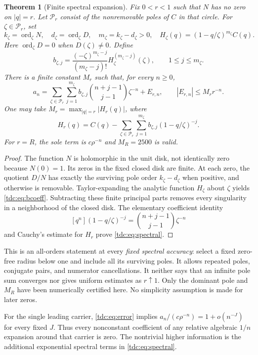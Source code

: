 \documentclass[11pt]{article}
\newtheorem{theorem}{Theorem}[section]
\theoremstyle{definition}\newtheorem{definition}[theorem]{Definition}
\theoremstyle{remark}\newtheorem{remark}[theorem]{Remark}
\newcommand{\PP}{\mathcal P}
\DeclareMathOperator{\ord}{ord}
\begin{document}
\begin{theorem}[Finite spectral expansion]\label{tdc:thm:spectral}
Fix $0<r<1$ such that $N$ has no zero on $|q|=r$. Let $\PP_r$ consist of the nonremovable poles of $C$ in that circle. For $\zeta\in\PP_r$, set
\[
 k_\zeta=\ord_\zeta N,\quad d_\zeta=\ord_\zeta D,
 \quad m_\zeta=k_\zeta-d_\zeta>0,
 \quad H_\zeta(q)=(1-q/\zeta)^{m_\zeta}C(q).
\]
Here $\ord_\zeta D=0$ when $D(\zeta)\ne0$. Define
\begin{equation}\label{tdc:eq:bcoeff}
 b_{\zeta,j}=\frac{(-\zeta)^{m_\zeta-j}}{(m_\zeta-j)!}
 H_\zeta^{(m_\zeta-j)}(\zeta),\qquad1\le j\le m_\zeta.
\end{equation}
There is a finite constant $M_r$ such that, for every $n\ge0$,
\begin{equation}\label{tdc:eq:spectral}
 a_n=\sum_{\zeta\in\PP_r}\sum_{j=1}^{m_\zeta}
 b_{\zeta,j}\binom{n+j-1}{j-1}\zeta^{-n}+E_{r,n},
 \qquad |E_{r,n}|\le M_r r^{-n}.
\end{equation}
One may take $M_r=\max_{|q|=r}|H_r(q)|$, where
\[
 H_r(q)=C(q)-\sum_{\zeta\in\PP_r}\sum_{j=1}^{m_\zeta}
 b_{\zeta,j}(1-q/\zeta)^{-j}.
\]
For $r=R$, the sole term is $c\rho^{-n}$ and $M_R=2500$ is valid.
\end{theorem}
\begin{proof}
The function $N$ is holomorphic in the unit disk, not identically zero because $N(0)=1$. Its zeros in the fixed closed disk are finite. At each zero, the quotient $D/N$ has exactly the surviving pole order $k_\zeta-d_\zeta$ when positive, and otherwise is removable. Taylor-expanding the analytic function $H_\zeta$ about $\zeta$ yields \eqref{tdc:eq:bcoeff}. Subtracting these finite principal parts removes every singularity in a neighborhood of the closed disk. The elementary coefficient identity
\[
 [q^n](1-q/\zeta)^{-j}=\binom{n+j-1}{j-1}\zeta^{-n}
\]
and Cauchy's estimate for $H_r$ prove \eqref{tdc:eq:spectral}.
\end{proof}

This is an all-orders statement at every \emph{fixed spectral accuracy}: select a fixed zero-free radius below one and include all its surviving poles. It allows repeated poles, conjugate pairs, and numerator cancellations. It neither says that an infinite pole sum converges nor gives uniform estimates as $r\uparrow1$. Only the dominant pole and $M_R$ have been numerically certified here. No simplicity assumption is made for later zeros.

For the single leading carrier, \eqref{tdc:eq:error} implies
$a_n/(c\rho^{-n})=1+o(n^{-J})$ for every fixed $J$. Thus every nonconstant coefficient of any relative algebraic $1/n$ expansion around that carrier is zero. The nontrivial higher information is the additional exponential spectral terms in \eqref{tdc:eq:spectral}.
\end{document}
